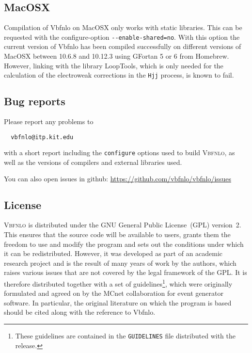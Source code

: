 \documentclass[english,12pt]{article}
\begin{document}
\subsection{MacOSX}

Compilation of {\sc Vbfnlo} on MacOSX only works with static libraries.
This can be requested with the configure-option {\tt -{}-enable-shared=no}.
With this option the current version of {\sc Vbfnlo} has been compiled successfully 
on different versions of MacOSX  between 10.6.8 and 10.12.3
using GFortan 5 or 6 from Homebrew.
However, linking with the library {\sc LoopTools}, which is only
needed for the calculation of the electroweak corrections in the {\tt Hjj}
process, is known to fail.



\subsection{Bug reports}

Please report any problems to
\begin{verbatim}
  vbfnlo@itp.kit.edu
\end{verbatim}
with a short report including the {\tt configure} options used to build
\textsc{Vbfnlo}, as well as the versions of compilers and external libraries
used.

You can also open issues in github: \url{https://github.com/vbfnlo/vbfnlo/issues}

\subsection{License}

\textsc{Vbfnlo} is distributed under the GNU General Public License~(GPL)
version~2. This ensures that the source code will be available to users,
grants them the freedom to use and modify the program and sets
out the conditions under which it can be redistributed. However, it was
developed as part of an academic research project and is the result of
many years of work by the authors, which raises various issues that are
not covered by the legal framework of the GPL. It is therefore
distributed together with a set of guidelines\footnote{These guidelines
are contained in the \texttt{GUIDELINES} file distributed with the
release.}, which were originally formulated and agreed on by the
MCnet collaboration for event generator software.
In particular, the original literature on which the program is based
should be cited along with the reference to {\sc Vbfnlo}.
\end{document}
